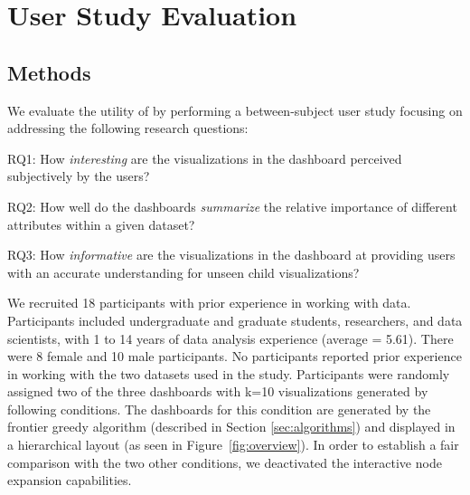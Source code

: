\section{User Study Evaluation\label{sec:userstudy}}
\subsection{Methods}
We evaluate the utility of \system by performing a between-subject user study focusing on addressing the following research questions:
\begin{denselist}
	\item RQ1: How \textit{interesting} are the visualizations in the dashboard perceived subjectively by the users?
	\item RQ2: How well do the dashboards \textit{summarize} the relative importance of different attributes within a given dataset?
	\item RQ3: How \textit{informative} are the visualizations in the dashboard at providing users with an accurate understanding for unseen child visualizations? %
\end{denselist}
We recruited 18 participants with prior experience in working with data. Participants included undergraduate and graduate students, researchers, and data scientists, with 1 to 14 years of data analysis experience (average = 5.61).  %
There were 8 female and 10 male participants. No participants reported prior experience in working with the two datasets used in the study. Participants were randomly assigned two of the three dashboards with k=10 visualizations generated by following conditions. 
\stitle{\system:} The dashboards for this condition are generated by the frontier greedy algorithm (described in Section \ref{sec:algorithms}) and displayed in a hierarchical layout (as seen in Figure~\ref{fig:overview}). In order to establish a fair comparison with the two other conditions, we deactivated the interactive node expansion capabilities.
